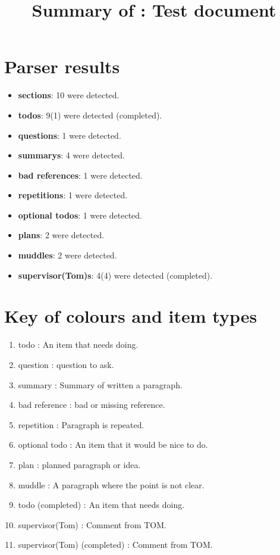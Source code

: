\title{Summary of : Test document}
\maketitle

\section{Parser results}
    \begin{itemize}[noitemsep]
\item \textbf{sections}: 10 were detected.
\item \textbf{todos}: 9(1) were detected (completed).
\item \textbf{questions}: 1 were detected.
\item \textbf{summarys}: 4 were detected.
\item \textbf{bad references}: 1 were detected.
\item \textbf{repetitions}: 1 were detected.
\item \textbf{optional todos}: 1 were detected.
\item \textbf{plans}: 2 were detected.
\item \textbf{muddles}: 2 were detected.
\item \textbf{supervisor(Tom)s}: 4(4) were detected (completed).
    \end{itemize}

\section{Key of colours and item types}
    \begin{enumerate}[noitemsep]
        \item {\color{red}todo : An item that needs doing.}
        \item {\color{ForestGreen}question : question to ask.}
        \item summary : Summary of written a paragraph.
        \item {\color{Periwinkle}bad reference : bad or missing reference.}
        \item {\color{DarkOrchid}repetition : Paragraph is repeated.}
        \item {\color{Orange}optional todo : An item that it would be nice to do.}
        \item {\color{blue}plan : planned paragraph or idea.}
        \item {\color{OliveGreen}muddle : A paragraph where the point is not clear.}
        \item {\color{Gray}todo (completed) : An item that needs doing.}
        \item {\color{WildStrawberry}supervisor(Tom) : Comment from TOM.}
        \item {\color{Gray}supervisor(Tom) (completed) : Comment from TOM.}
    \end{enumerate}

